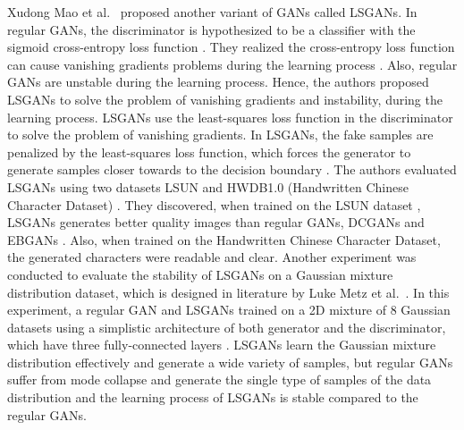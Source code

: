 Xudong Mao et al.\ \cite{mao2017squares} proposed another variant of \acp{GAN} called \acp{LSGAN}. In regular \acp{GAN}, the discriminator is hypothesized to be a classifier with the sigmoid cross-entropy loss function \cite{mao2017squares}. They realized the cross-entropy loss function can cause vanishing gradients problems during the learning process \cite{mao2017squares}. Also, regular \acp{GAN} are unstable during the learning process. Hence, the authors proposed \acp{LSGAN} to solve the problem of vanishing gradients and instability, during the learning process. \acp{LSGAN} use the least-squares loss function in the discriminator to solve the problem of vanishing gradients. In \acp{LSGAN}, the fake samples are penalized by the least-squares loss function, which forces the generator to generate samples closer towards to the decision boundary \cite{mao2017squares}. The authors evaluated \acp{LSGAN} using two datasets LSUN \cite{yu2016lsun} and HWDB1.0 (Handwritten Chinese Character Dataset) \cite{6065551}. They discovered, when trained on the LSUN dataset \cite{yu2016lsun}, \acp{LSGAN} generates better quality images than regular \acp{GAN}, \acp{DCGAN} \cite{radford2016unsupervised} and \acp{EBGAN} \cite{zhao2017energybased}. Also, when trained on the Handwritten Chinese Character Dataset, the generated characters were readable and clear. Another experiment was conducted to evaluate the stability of \acp{LSGAN} on a Gaussian mixture distribution dataset, which is designed in literature by Luke Metz et al.\ \cite{metz2017unrolled}. In this experiment, a regular \ac{GAN} and \acp{LSGAN} trained on a \ac{2D} mixture of 8 Gaussian datasets using a simplistic architecture of both generator and the discriminator, which have three fully-connected layers \cite{mao2017squares}. \acp{LSGAN} learn the Gaussian mixture distribution effectively and generate a wide variety of samples, but regular \acp{GAN} suffer from mode collapse and generate the single type of samples of the data distribution \cite{mao2017squares} and the learning process of \acp{LSGAN} is stable compared to the regular \acp{GAN}.



